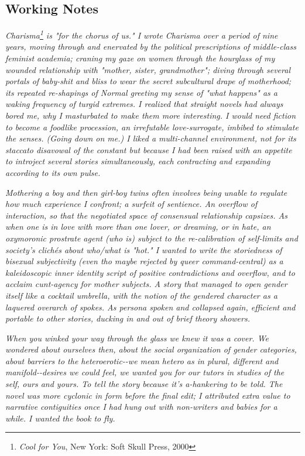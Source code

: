 \documentclass[
]{memoir}
\begin{document}
\hypertarget{working-notes-1}{%
\subsection*{Working Notes}\label{working-notes-1}}

\emph{Charisma\footnote{\emph{Cool for You}, New York: Soft Skull Press,
  2000} is "for the chorus of us." I wrote Charisma over a period of
nine years, moving through and enervated by the political prescriptions
of middle-class feminist academia; craning my gaze on women through the
hourglass of my wounded relationship with "mother, sister, grandmother";
diving through several portals of baby-shit and bliss to wear the secret
subcultural drape of motherhood; its repeated re-shapings of Normal
greeting my sense of "what happens" as a waking frequency of turgid
extremes. I realized that straight novels had always bored me, why I
masturbated to make them more interesting. I would need fiction to
become a foodlike procession, an irrefutable love-surrogate, imbibed to
stimulate the senses. (Going down on me.) I liked a multi-channel
environment, not for its staccato disavowal of the constant but because
I had been raised with an appetite to introject several stories
simultaneously, each contracting and expanding according to its own
pulse.}

\emph{Mothering a boy and then girl-boy twins often involves being
unable to regulate how much experience I confront; a surfeit of
sentience. An overflow of interaction, so that the negotiated space of
consensual relationship capsizes. As when one is in love with more than
one lover, or dreaming, or in hate, an oxymoronic prostrate agent (who
is) subject to the re-calibration of self-limits and society's clichés
about who/what is "hot." I wanted to write the storiedness of bisexual
subjectivity (even tho maybe rejected by queer command-central) as a
kaleidoscopic inner identity script of positive contradictions and
overflow, and to acclaim cunt-agency for mother subjects. A story that
managed to open gender itself like a cocktail umbrella, with the notion
of the gendered character as a laquered overarch of spokes. As persona
spoken and collapsed again, efficient and portable to other stories,
ducking in and out of brief theory showers.}

\emph{When you winked your way through the glass we knew it was a cover.
We wondered about ourselves then, about the social organization of
gender categories, about barriers to the heteroerotic-\/-we mean hetero
as in plural, different and manifold-\/-desires we could feel, we wanted
you for our tutors in studies of the self, ours and yours. To tell the
story because it's a-hankering to be told. The novel was more cyclonic
in form before the final edit; I attributed extra value to narrative
contiguities once I had hung out with non-writers and babies for a
while. I wanted the book to fly.}
\end{document}
